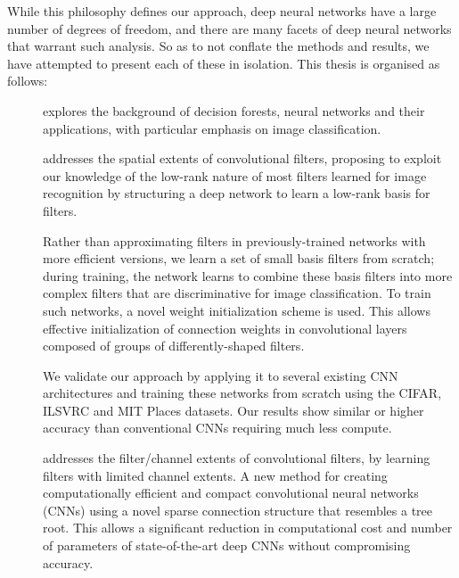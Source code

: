 \documentclass[thesis]{subfiles}
\begin{document}
While this philosophy defines our approach, deep neural networks have a large number of degrees of freedom, and there are many facets of deep neural networks that warrant such analysis. So as to not conflate the methods and results, we have attempted to present each of these in isolation. This thesis is organised as follows:
\begin{description}
	\item[] explores the background of decision forests, neural networks and their applications, with particular emphasis on image classification.
	
	\item[] addresses the spatial extents of convolutional filters, proposing to exploit our knowledge of the low-rank nature of most filters learned for image recognition by structuring a deep network to learn a low-rank basis for filters.
	
	Rather than approximating filters in previously-trained networks with more efficient versions, we learn a set of small basis filters from scratch; during training, the network learns to combine these basis filters into more complex filters that are discriminative for image classification. To train such networks, a novel weight initialization scheme is used. This allows effective initialization of connection weights in convolutional layers composed of groups of differently-shaped filters. 
	
	We validate our approach by applying it to several existing CNN architectures and training these networks from scratch using the CIFAR, ILSVRC and MIT Places datasets. Our results show similar or higher accuracy than conventional CNNs requiring much less compute. %
	
	\item[] addresses the filter/channel extents of convolutional filters, by learning filters with limited channel extents. A new method for creating computationally efficient and compact convolutional neural networks (CNNs) using a novel sparse connection structure that resembles a tree root. This allows a significant reduction in computational cost and number of parameters of state-of-the-art deep CNNs without compromising accuracy. 
	

\end{description}
\end{document}
